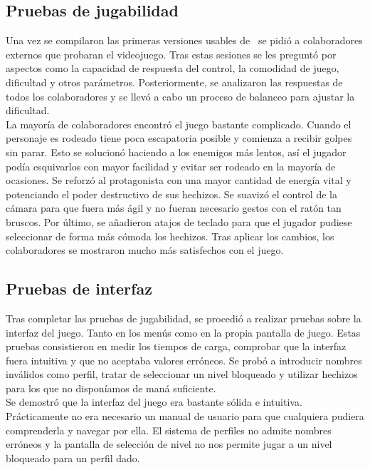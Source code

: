 \subsection{Pruebas de jugabilidad}

Una vez se compilaron las primeras versiones usables de \juego\ se pidió
a colaboradores externos que probaran el videojuego. Tras estas sesiones
se les preguntó por aspectos como la capacidad de respuesta del control,
la comodidad de juego, dificultad y otros parámetros. Posteriormente,
se analizaron las respuestas de todos los colaboradores y se llevó a cabo
un proceso de balanceo para ajustar la dificultad.\\

La mayoría de colaboradores encontró el juego bastante complicado. Cuando
el personaje es rodeado tiene poca escapatoria posible y comienza a recibir
golpes sin parar. Esto se solucionó haciendo a los enemigos más lentos,
así el jugador podía esquivarlos con mayor facilidad y evitar ser rodeado
en la mayoría de ocasiones. Se reforzó al protagonista con una mayor cantidad
de energía vital y potenciando el poder destructivo de sus hechizos. 
Se suavizó el control de la cámara para que fuera más ágil y no fueran necesario
gestos con el ratón tan bruscos. Por último, se añadieron atajos de teclado
para que el jugador pudiese seleccionar de forma más cómoda los hechizos.
Tras aplicar los cambios, los colaboradores se mostraron mucho más
satisfechos con el juego.\\

\subsection{Pruebas de interfaz}

Tras completar las pruebas de jugabilidad, se procedió a realizar pruebas
sobre la interfaz del juego. Tanto en los menús como en la propia pantalla de
juego. Estas pruebas consistieron en medir los tiempos de carga, comprobar
que la interfaz fuera intuitiva y que no aceptaba valores erróneos. Se probó
a introducir nombres inválidos como perfil, tratar de seleccionar un nivel
bloqueado y utilizar hechizos para los que no disponíamos de maná suficiente.\\

Se demostró que la interfaz del juego era bastante sólida e intuitiva.
Prácticamente no era necesario un manual de usuario para que cualquiera
pudiera comprenderla y navegar por ella. El sistema de perfiles no admite
nombres erróneos y la pantalla de selección de nivel no nos permite
jugar a un nivel bloqueado para un perfil dado.\\


